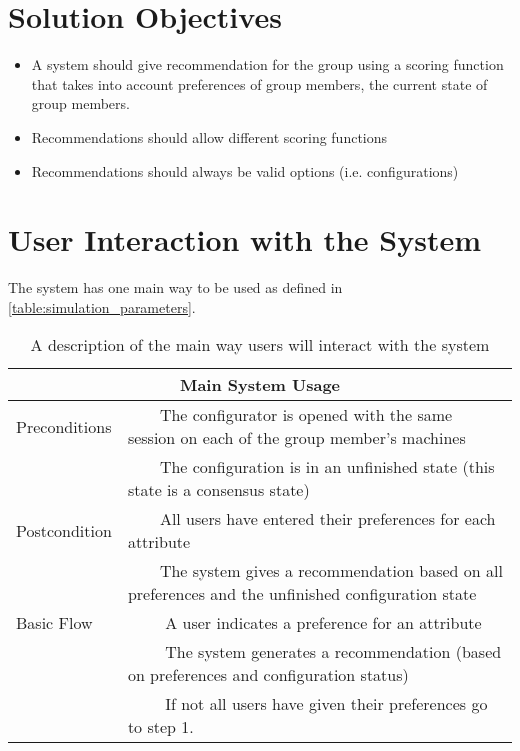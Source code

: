 \documentclass{article}
\newcommand{\tabitem}[1][\textbullet]{~~\llap{#1}~~}
\begin{document}
\section{Solution Objectives}

\begin{itemize}
    \item A system should give recommendation for the group using a scoring function that takes into account preferences of group members, the current state of group members.
    \item Recommendations should allow different scoring functions
    \item Recommendations should always be valid options (i.e. configurations)
\end{itemize}

\section{User Interaction with the System}
The system has one main way to be used as defined in \autoref{table:simulation_parameters}.

\begin{table}
    \begin{center}
        \begin{tabularx}{\columnwidth}{l|X}
            \multicolumn{2}{c}{Main System Usage} \\
            \hline
            Preconditions   & \tabitem The configurator is opened with the same session on each of the group member's machines \\
                            & \tabitem The configuration is in an unfinished state (this state is a consensus state)\\
            \hline
            Postcondition   & \tabitem All users have entered their preferences for each attribute \\
                            & \tabitem The system gives a recommendation based on all preferences and the unfinished configuration state \\
            \hline
            Basic Flow      & \tabitem[1.] A user indicates a preference for an attribute \\
                            & \tabitem[2.] The system generates a recommendation (based on preferences and configuration status) \\
                            & \tabitem[3.] If not all users have given their preferences go to step 1. \\
            \hline
        \end{tabularx}
        \caption{A description of the main way users will interact with the system}
        \label{table:simulation_parameters}
    \end{center}
\end{table}
\end{document}
